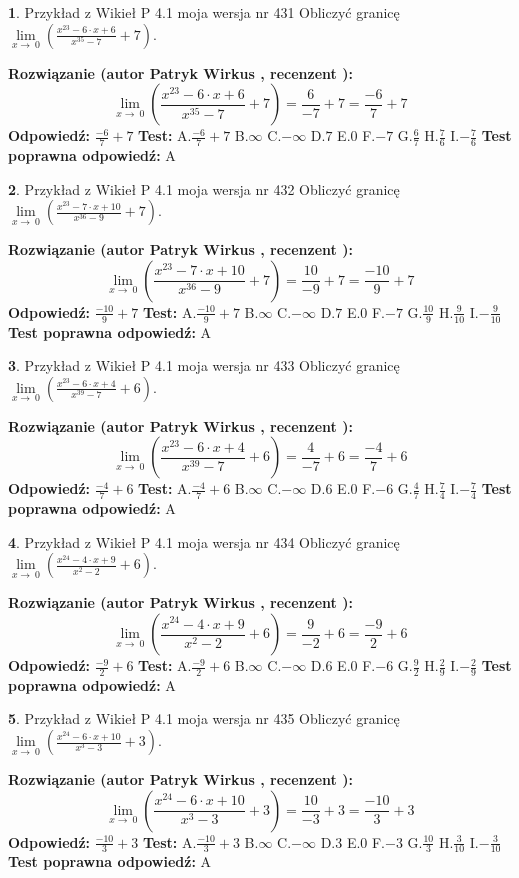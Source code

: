 \documentclass[12pt, a4paper]{article}
\theoremstyle{definition} %
\newtheorem{zad}{}
\newcommand{\zadStart}[1]{\begin{zad}#1\newline}
\newcommand{\zadStop}{\end{zad}}
\newcommand{\rozwStart}[2]{\noindent \textbf{Rozwiązanie (autor #1 , recenzent #2): }\newline}
\newcommand{\rozwStop}{\newline}
\newcommand{\odpStart}{\noindent \textbf{Odpowiedź:}\newline}
\newcommand{\odpStop}{\newline}
\newcommand{\testStart}{\noindent \textbf{Test:}\newline}
\newcommand{\testStop}{\newline}
\newcommand{\kluczStart}{\noindent \textbf{Test poprawna odpowiedź:}\newline}
\newcommand{\kluczStop}{\newline}
\begin{document}
\zadStart{Przykład z Wikieł P 4.1 moja wersja nr 431}
Obliczyć granicę $\lim\limits_{x\to\ 0}(\frac{x^{23}-6 \cdot x +6}{x^{35}-7}+7)$.
\zadStop
\rozwStart{Patryk Wirkus}{}
$$\lim\limits_{x\to\ 0}(\frac{x^{23}-6 \cdot x +6}{x^{35}-7}+7)=\frac{6}{-7}+7=\frac{-6}{7}+7$$
\rozwStop
\odpStart
$\frac{-6}{7}+7$
\odpStop
\testStart
A.$\frac{-6}{7}+7$
B.$\infty$
C.$-\infty$
D.$7$
E.$0$
F.$-7$
G.$\frac{6}{7}$
H.$\frac{7}{6}$
I.$-\frac{7}{6}$
\testStop
\kluczStart
A
\kluczStop



\zadStart{Przykład z Wikieł P 4.1 moja wersja nr 432}
Obliczyć granicę $\lim\limits_{x\to\ 0}(\frac{x^{23}-7 \cdot x +10}{x^{36}-9}+7)$.
\zadStop
\rozwStart{Patryk Wirkus}{}
$$\lim\limits_{x\to\ 0}(\frac{x^{23}-7 \cdot x +10}{x^{36}-9}+7)=\frac{10}{-9}+7=\frac{-10}{9}+7$$
\rozwStop
\odpStart
$\frac{-10}{9}+7$
\odpStop
\testStart
A.$\frac{-10}{9}+7$
B.$\infty$
C.$-\infty$
D.$7$
E.$0$
F.$-7$
G.$\frac{10}{9}$
H.$\frac{9}{10}$
I.$-\frac{9}{10}$
\testStop
\kluczStart
A
\kluczStop



\zadStart{Przykład z Wikieł P 4.1 moja wersja nr 433}
Obliczyć granicę $\lim\limits_{x\to\ 0}(\frac{x^{23}-6 \cdot x +4}{x^{39}-7}+6)$.
\zadStop
\rozwStart{Patryk Wirkus}{}
$$\lim\limits_{x\to\ 0}(\frac{x^{23}-6 \cdot x +4}{x^{39}-7}+6)=\frac{4}{-7}+6=\frac{-4}{7}+6$$
\rozwStop
\odpStart
$\frac{-4}{7}+6$
\odpStop
\testStart
A.$\frac{-4}{7}+6$
B.$\infty$
C.$-\infty$
D.$6$
E.$0$
F.$-6$
G.$\frac{4}{7}$
H.$\frac{7}{4}$
I.$-\frac{7}{4}$
\testStop
\kluczStart
A
\kluczStop



\zadStart{Przykład z Wikieł P 4.1 moja wersja nr 434}
Obliczyć granicę $\lim\limits_{x\to\ 0}(\frac{x^{24}-4 \cdot x +9}{x^{2}-2}+6)$.
\zadStop
\rozwStart{Patryk Wirkus}{}
$$\lim\limits_{x\to\ 0}(\frac{x^{24}-4 \cdot x +9}{x^{2}-2}+6)=\frac{9}{-2}+6=\frac{-9}{2}+6$$
\rozwStop
\odpStart
$\frac{-9}{2}+6$
\odpStop
\testStart
A.$\frac{-9}{2}+6$
B.$\infty$
C.$-\infty$
D.$6$
E.$0$
F.$-6$
G.$\frac{9}{2}$
H.$\frac{2}{9}$
I.$-\frac{2}{9}$
\testStop
\kluczStart
A
\kluczStop



\zadStart{Przykład z Wikieł P 4.1 moja wersja nr 435}
Obliczyć granicę $\lim\limits_{x\to\ 0}(\frac{x^{24}-6 \cdot x +10}{x^{3}-3}+3)$.
\zadStop
\rozwStart{Patryk Wirkus}{}
$$\lim\limits_{x\to\ 0}(\frac{x^{24}-6 \cdot x +10}{x^{3}-3}+3)=\frac{10}{-3}+3=\frac{-10}{3}+3$$
\rozwStop
\odpStart
$\frac{-10}{3}+3$
\odpStop
\testStart
A.$\frac{-10}{3}+3$
B.$\infty$
C.$-\infty$
D.$3$
E.$0$
F.$-3$
G.$\frac{10}{3}$
H.$\frac{3}{10}$
I.$-\frac{3}{10}$
\testStop
\kluczStart
A
\kluczStop
\end{document}
